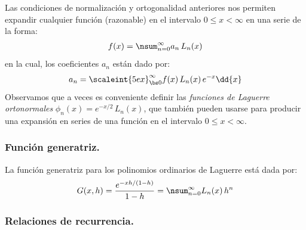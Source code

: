 Las condiciones de normalización y ortogonalidad anteriores nos permiten expandir cualquier función (razonable) en el intervalo $0 \leq x < \infty$ en una serie de la forma:
\begin{align*}
f(x) = \nsum_{n=0}^{\infty} a_{n} \, L_{n} (x)
\end{align*}
en la cual, los coeficientes $a_{n}$ están dado por:
\begin{align*}
a_{n} = \scaleint{5ex}_{\bs 0}^{\infty} f(x) \, L_{n}(x) \, e^{-x} \dd{x}
\end{align*}
Observamos que a veces es conveniente definir las \emph{funciones de Laguerre ortonormales} $\phi_{n} (x) = e^{-x/2} \, L_{n} (x)$, que también pueden usarse para producir una expansión en series de una función en el intervalo $0 \leq x < \infty$.

\subsubsection{Función generatriz.}

La función generatriz para los polinomios ordinarios de Laguerre está dada por:
\begin{align}
G(x, h) = \dfrac{e^{-xh/(1-h)}}{1- h} = \nsum_{n=0}^{\infty} L_{n} (x) \, h^{n}
\label{eq:ecuacion_18_114}
\end{align}

\subsubsection{Relaciones de recurrencia.}\label{sec:subsub_relaciones_recurrencia}

